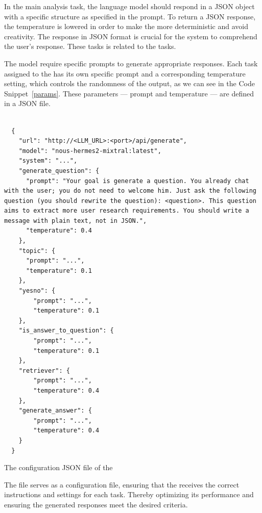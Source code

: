 In the main analysis task, the language model should respond in a JSON object with a specific structure as specified in the prompt. To return a JSON response, the temperature is lowered in order to make the {\llm} more deterministic and avoid creativity. The response in JSON format is crucial for the system to comprehend the user's response. These tasks is related to the {\nlu} tasks.


The model require specific prompts to generate appropriate responses. Each task assigned to the {\llm} has its own specific prompt and a corresponding temperature setting, which controls the randomness of the output, as we can see in the Code Snippet~\ref{params}. These parameters — prompt and temperature — are defined in a JSON file. 

\begin{listing}[H]
  \begin{verbatim}
      
  {
    "url": "http://<LLM_URL>:<port>/api/generate",
    "model": "nous-hermes2-mixtral:latest",
    "system": "...",
    "generate_question": {
      "prompt": "Your goal is generate a question. You already chat with the user; you do not need to welcome him. Just ask the following question (you should rewrite the question): <question>. This question aims to extract more user research requirements. You should write a message with plain text, not in JSON.",
      "temperature": 0.4
    },
    "topic": {
      "prompt": "...",
      "temperature": 0.1
    },
    "yesno": {
        "prompt": "...",
        "temperature": 0.1
    },
    "is_answer_to_question": {
        "prompt": "...",
        "temperature": 0.1
    },
    "retriever": {
        "prompt": "...",
        "temperature": 0.4
    },
    "generate_answer": {
        "prompt": "...",
        "temperature": 0.4
    }
  }
  \end{verbatim}
  \caption[The configuration file of the Large Language Model]{The configuration JSON file of the {\llm}}
  \label{params}
\end{listing}

The file serves as a configuration file, ensuring that the {\llm} receives the correct instructions and settings for each task. Thereby optimizing its performance and ensuring the generated responses meet the desired criteria.

